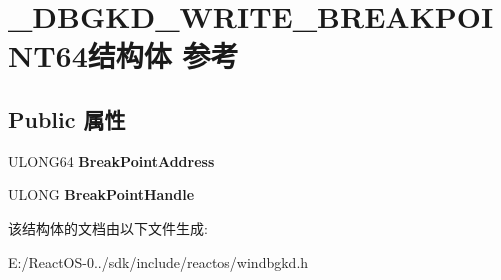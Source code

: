 \hypertarget{struct___d_b_g_k_d___w_r_i_t_e___b_r_e_a_k_p_o_i_n_t64}{}\section{\+\_\+\+D\+B\+G\+K\+D\+\_\+\+W\+R\+I\+T\+E\+\_\+\+B\+R\+E\+A\+K\+P\+O\+I\+N\+T64结构体 参考}
\label{struct___d_b_g_k_d___w_r_i_t_e___b_r_e_a_k_p_o_i_n_t64}
\subsection*{Public 属性}
\begin{DoxyCompactItemize}
\item 
\mbox{\label{struct___d_b_g_k_d___w_r_i_t_e___b_r_e_a_k_p_o_i_n_t64_a3295290330a6d8dea6077d70b92d015e}} 
U\+L\+O\+N\+G64 {\bfseries Break\+Point\+Address}
\item 
\mbox{\label{struct___d_b_g_k_d___w_r_i_t_e___b_r_e_a_k_p_o_i_n_t64_ac089ca77fcb7884450170bee2de0b27d}} 
U\+L\+O\+NG {\bfseries Break\+Point\+Handle}
\end{DoxyCompactItemize}


该结构体的文档由以下文件生成\+:\begin{DoxyCompactItemize}
\item 
E\+:/\+React\+O\+S-\/0../sdk/include/reactos/windbgkd.\+h\end{DoxyCompactItemize}
